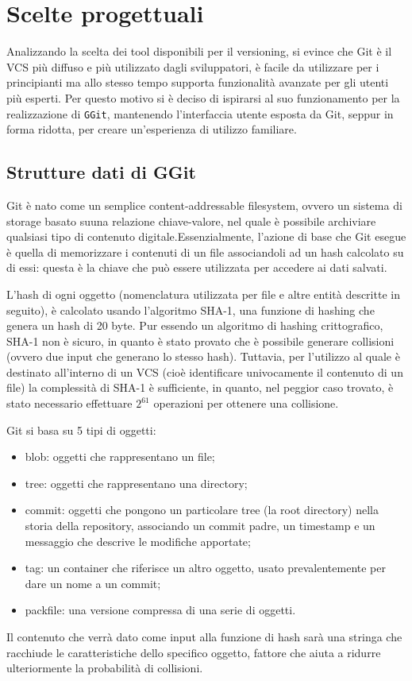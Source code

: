 \chapter{Scelte progettuali}
\label{chap:scelte_progettuali}
Analizzando la scelta dei tool disponibili per il versioning, si evince che Git è il VCS più diffuso e più utilizzato\cite{gitmostused} dagli sviluppatori, è facile da utilizzare per i principianti ma allo stesso tempo supporta funzionalità avanzate per gli utenti più esperti. Per questo motivo si è deciso di ispirarsi al suo funzionamento per la realizzazione di \texttt{GGit}, mantenendo l'interfaccia utente esposta da Git, seppur in forma ridotta, per creare un'esperienza di utilizzo familiare.
\section{Strutture dati di GGit}
\label{sec:strutture_dati}
Git è nato come un semplice content-addressable filesystem, ovvero un sistema di storage basato suuna relazione chiave-valore, nel quale è possibile archiviare qualsiasi tipo di contenuto digitale.Essenzialmente, l'azione di base che Git esegue è quella di memorizzare i contenuti di un file associandoli ad un hash calcolato su di essi: questa è la chiave che può essere utilizzata per accedere ai dati salvati.

L'hash di ogni oggetto (nomenclatura utilizzata per file e altre entità descritte in seguito), è calcolato usando l'algoritmo SHA-1, una funzione di hashing che genera un hash di 20 byte.
Pur essendo un algoritmo di hashing crittografico, SHA-1 non è sicuro, in quanto è stato provato che è possibile generare collisioni\cite{sha1collision} (ovvero due input che generano lo stesso hash).
Tuttavia, per l'utilizzo al quale è destinato all'interno di un VCS (cioè identificare univocamente il contenuto di un file) la complessità di SHA-1 è sufficiente, in quanto, nel peggior caso trovato, è stato necessario effettuare $2^{61}$ operazioni per ottenere una collisione\cite{collisionprob}.

Git si basa su 5 tipi di oggetti:
\begin{itemize}
    \item blob: oggetti che rappresentano un file;
    \item tree: oggetti che rappresentano una directory;
    \item commit: oggetti che pongono un particolare tree (la root directory) nella storia della repository, associando un commit padre, un timestamp e un messaggio che descrive le modifiche apportate;
    \item tag: un container che riferisce un altro oggetto, usato prevalentemente per dare un nome a un commit;
    \item packfile: una versione compressa di una serie di oggetti.
\end{itemize}
Il contenuto che verrà dato come input alla funzione di hash sarà una stringa che racchiude le caratteristiche dello specifico oggetto, fattore che aiuta a ridurre ulteriormente la probabilità di collisioni.

